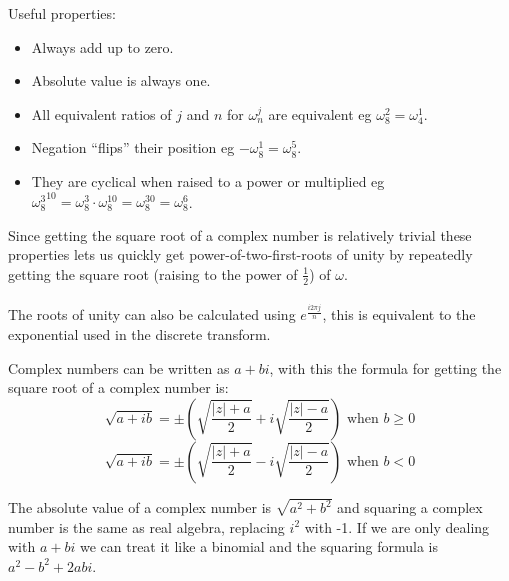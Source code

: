 \documentclass{beamer}
\begin{document}
\begin{frame}
  Useful properties:
  \begin{itemize}
    \item Always add up to zero.
    \item Absolute value is always one.
    \item All equivalent ratios of $j$ and $n$ for $\omega_n^j$ are equivalent eg $\omega_8^2 = \omega_4^1$.
    \item Negation ``flips'' their position eg $-\omega_8^1 = \omega_8^5$.
    \item They are cyclical when raised to a power or multiplied eg ${\omega_8^3}^{10} = \omega_8^3 \cdot \omega_8^{10} = \omega_8^{30} = \omega_8^6$.
  \end{itemize}
  Since getting the square root of a complex number is relatively trivial these properties lets us quickly get power-of-two-first-roots of unity by repeatedly getting the square root (raising to the power of $\frac{1}{2}$) of $\omega$.\\~\\
  The roots of unity can also be calculated using $e^\frac{i2\pi j}{n}$, this is equivalent to the exponential used in the discrete transform.
\end{frame}

\begin{frame}
  Complex numbers can be written as $a + bi$, with this the formula for getting the square root of a complex number is:
  \begin{displaymath}
    \sqrt{a+ib} = \pm\left(\sqrt{\frac{|z| + a}{2}} + i\sqrt{\frac{|z| - a}{2}}\right) \text{ when } b \ge 0
  \end{displaymath}
  \begin{displaymath}
    \sqrt{a+ib} = \pm\left(\sqrt{\frac{|z| + a}{2}} - i\sqrt{\frac{|z| - a}{2}}\right) \text{ when } b < 0
  \end{displaymath}

  The absolute value of a complex number is $\sqrt{a^2+b^2}$ and squaring a complex number is the same as real algebra, replacing $i^2$ with -1. If we are only dealing with $a + bi$ we can treat it like a binomial and the squaring formula is $a^2 - b^2 + 2abi$.
\end{frame}
\end{document}
